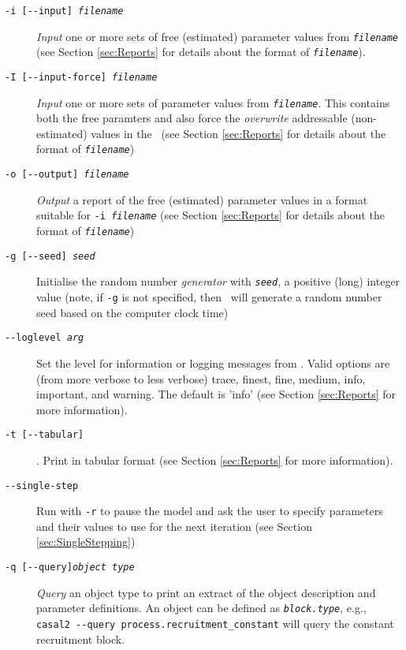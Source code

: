 \begin{description}
\item [\texttt{-i [-{}-input] \emph{filename}}] \emph{Input} one or more sets of free (estimated) parameter values from \texttt{\emph{filename}} (see Section \ref{sec:Reports} for details about the format of \texttt{\emph{filename}}).

\item [\texttt{-I [-{}-input-force] \emph{filename}}] \emph{Input} one or more sets of parameter values from \texttt{\emph{filename}}. This contains both the free paramters and also force the \emph{overwrite} addressable (non-estimated) values in the \config\ (see Section \ref{sec:Reports} for details about the format of \texttt{\emph{filename}})

\item [\texttt{-o [-{}-output] \emph{filename}}] \emph{Output} a report of the free (estimated) parameter values in a format suitable for \texttt{-i \emph{filename}} (see Section \ref{sec:Reports} for details about the format of \texttt{\emph{filename}})

\item [\texttt{-g [-{}-seed] \emph{seed}}] Initialise the random number \emph{generator} with \texttt{\emph{seed}}, a positive (long) integer value (note, if \texttt{-g} is not specified, then \CNAME\ will  generate a random number seed based on the computer clock time)

\item [\texttt{-{}-loglevel \emph{arg}}] Set the level for information or logging messages from \CNAME. Valid options are (from more verbose to less verbose) trace, finest, fine, medium, info, important, and warning. The default is 'info' (see Section \ref{sec:Reports} for more information).

\item [\texttt{-t [-{}-tabular]}]. Print  in tabular format (see Section \ref{sec:Reports} for more information).

\item [\texttt{-{}-single-step}] Run with \texttt{-r} to pause the model and ask the user to specify parameters and their values to use for the next iteration (see Section \ref{sec:SingleStepping})

\item [\texttt{-q [-{}-query]\emph{object type}}] \emph{Query} an object type to print an extract of the object description and parameter definitions.  An object can be defined as \texttt{\emph{block.type}}, e.g., \texttt{casal2 -{}-query process.recruitment\_constant} will query the constant recruitment block.

\end{description}

